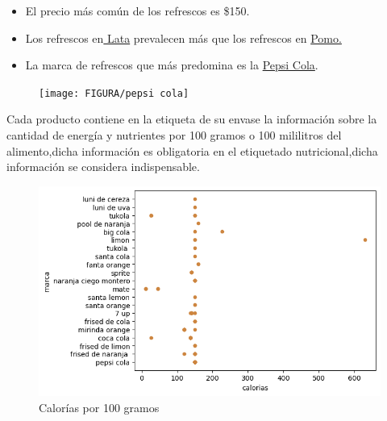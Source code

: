 \documentclass[10pt]{beamer}
\begin{document}
   	\begin{frame}
   		
   		\begin{itemize}
   			\item{El precio más común de los refrescos es \$150.}
   				\item{Los refrescos en\underline{ Lata} prevalecen más que los refrescos en \underline{Pomo.}}
   			\item{La marca de refrescos que más predomina es la \underline{Pepsi Cola}.}
   	    \end{itemize}
   		
   		
   		\begin{figure}
   			\centering
   			\texttt{[image: FIGURA/pepsi cola]}
   			\caption{}
   			\label{fig:pepsi-cola}
   		\end{figure}
   		
   	\end{frame}
   	
   	
   	\begin{frame}
   		
   		Cada producto contiene en la etiqueta de su envase la información sobre la cantidad de energía y nutrientes por 100  gramos o 100 mililitros del alimento,dicha información es obligatoria en el etiquetado nutricional,dicha información se considera indispensable.
   		
   		
   		\begin{figure}
   			\centering
   			\includegraphics[width=0.6\linewidth]{FIGURA/calorías refrescos}
   			\caption{Calorías por 100 gramos}
   			\label{fig:calorias-refrescos}
   		\end{figure}
   		
   	\end{frame}
   	
\end{document}
